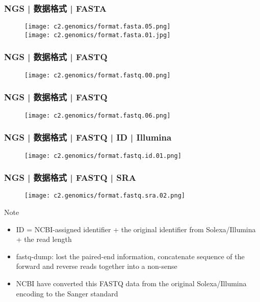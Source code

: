 \begin{frame}
  \frametitle{NGS | 数据格式 | \alert{FASTA}}
  \begin{figure}
    \centering
    \texttt{[image: c2.genomics/format.fasta.05.png]}\\
    \vspace{1em}
    \texttt{[image: c2.genomics/format.fasta.01.jpg]}
  \end{figure}
\end{frame}

\begin{frame}
  \frametitle{NGS | 数据格式 | \alert{FASTQ}}
  \begin{figure}
    \centering
    \texttt{[image: c2.genomics/format.fastq.00.png]}
  \end{figure}
\end{frame}

\begin{frame}
  \frametitle{NGS | 数据格式 | \alert{FASTQ}}
  \begin{figure}
    \centering
    \texttt{[image: c2.genomics/format.fastq.06.png]}
  \end{figure}
\end{frame}

\begin{frame}
  \frametitle{NGS | 数据格式 | FASTQ | ID | Illumina}
  \begin{figure}
    \centering
    \texttt{[image: c2.genomics/format.fastq.id.01.png]}
  \end{figure}
\end{frame}

\begin{frame}
  \frametitle{NGS | 数据格式 | FASTQ | SRA}
  \begin{figure}
    \centering
    \texttt{[image: c2.genomics/format.fastq.sra.02.png]}
  \end{figure}
  \begin{block}{Note}
    \begin{itemize}
      \item ID = NCBI-assigned identifier + the original identifier from Solexa/Illumina + the read length
      \item \alert{fastq-dump}: lost the paired-end information, concatenate sequence of the forward and reverse reads together into a non-sense
      \item NCBI have converted this FASTQ data from the original Solexa/Illumina encoding to the \alert{Sanger standard}
    \end{itemize}
  \end{block}
\end{frame}

